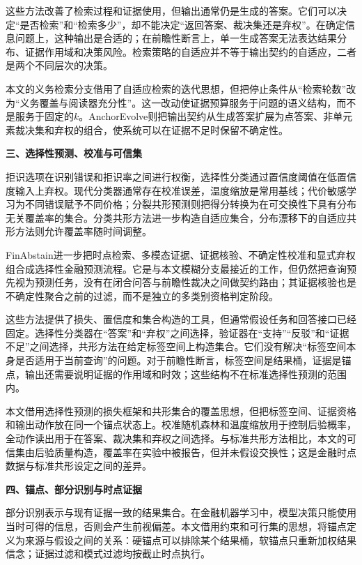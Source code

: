 这些方法改善了检索过程和证据使用，但输出通常仍是生成的答案。它们可以决定“是否检索”和“检索多少”，却不能决定“返回答案、裁决集还是弃权”。在确定信息问题上，这种输出是合适的；在前瞻性断言上，单一生成答案无法表达结果分布、证据作用域和决策风险。检索策略的自适应并不等于输出契约的自适应，二者是两个不同层次的决策。

本文的义务检索分支借用了自适应检索的迭代思想，但把停止条件从“检索轮数”改为“义务覆盖与阅读器充分性”。这一改动使证据预算服务于问题的语义结构，而不是服务于固定的$k$。AnchorEvolve则把输出契约从生成答案扩展为点答案、非单元素裁决集和弃权的组合，使系统可以在证据不足时保留不确定性。

\noindent\textbf{三、选择性预测、校准与可信集}

拒识选项在识别错误和拒识率之间进行权衡\citep{chow1970optimum}，选择性分类通过置信度阈值在低置信度输入上弃权\citep{geifman2017selective}。现代分类器通常存在校准误差，温度缩放是常用基线\citep{guo2017calibration}；代价敏感学习为不同错误赋予不同价格\citep{elkan2001cost}；分裂共形预测则把得分转换为在可交换性下具有分布无关覆盖率的集合\citep{vovk2005algorithmic,angelopoulos2021gentle}。分类共形方法进一步构造自适应集合\citep{romano2020classification}，分布漂移下的自适应共形方法则允许覆盖率随时间调整\citep{gibbs2021adaptive}。

FinAbstain进一步把时点检索、多模态证据、证据核验、不确定性校准和显式弃权组合成选择性金融预测流程\citep{torres2026finabstain}。它是与本文模糊分支最接近的工作，但仍然把查询预先视为预测任务，没有在闭合问答与前瞻性裁决之间做契约路由；其证据核验也是不确定性聚合之前的过滤，而不是独立的多类别资格判定阶段。

这些方法提供了损失、置信度和集合构造的工具，但通常假设任务和回答接口已经固定。选择性分类器在“答案”和“弃权”之间选择，验证器在“支持”“反驳”和“证据不足”之间选择，共形方法在给定标签空间上构造集合。它们没有解决“标签空间本身是否适用于当前查询”的问题。对于前瞻性断言，标签空间是结果桶，证据是锚点，输出还需要说明证据的作用域和时效；这些结构不在标准选择性预测的范围内。

本文借用选择性预测的损失框架和共形集合的覆盖思想，但把标签空间、证据资格和输出动作放在同一个锚点状态上。校准随机森林和温度缩放用于控制后验概率，全动作读出用于在答案、裁决集和弃权之间选择。与标准共形方法相比，本文的可信集由后验质量构造，覆盖率在实验中被报告，但并未假设交换性；这是金融时点数据与标准共形设定之间的差异。

\noindent\textbf{四、锚点、部分识别与时点证据}

部分识别表示与现有证据一致的结果集合\citep{manski2003partial}。在金融机器学习中，模型决策只能使用当时可得的信息，否则会产生前视偏差\citep{lopezdeprado2018advances}。本文借用约束和可行集的思想，将锚点定义为来源与假设之间的关系：硬锚点可以排除某个结果桶，软锚点只重新加权结果信念；证据过滤和模式过滤均按截止时点执行。

